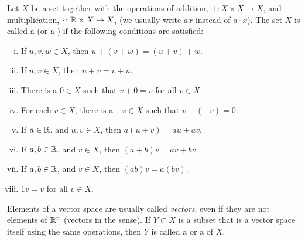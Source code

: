 \begin{defn}
Let $X$ be a set together with
the operations of addition, $+ \colon X \times X \to X$,
and multiplication, $\cdot \colon {\mathbb{R}} \times X \to X$,
(we usually write $ax$ instead of $a \cdot x$).
The set $X$ is called a \emph{}
(or a \emph{})
if the following conditions are satisfied:
\begin{enumerate}[(i)]
\item
If $u, v, w \in X$, then $u+(v+w) = (u+v)+w$.
\item
If $u, v \in X$, then $u+v = v+u$.
\item \label{vecspacedefn:addidentity}
There is a $0 \in X$ such that $v+0=v$ for all $v \in X$.
\item \label{vecspacedefn:addinverse}
For each $v \in X$, there is a $-v \in X$
such that $v+(-v)=0$.
\item
If $a \in {\mathbb{R}}$, and $u,v \in X$, then
$a(u+v) = au+av$.
\item
If $a,b \in {\mathbb{R}}$, and $v \in X$, then
$(a+b)v = av+bv$.
\item
If $a,b \in {\mathbb{R}}$, and $v \in X$, then
$(ab)v = a(bv)$.
\item
$1v = v$ for all $v \in X$.
\end{enumerate}
Elements of a vector space are usually called \emph{vectors},
even if they
are not elements of ${\mathbb{R}}^n$ (vectors in the  sense).
%
If $Y \subset X$ is a subset that is a vector space itself using the same
operations, then $Y$ is called a \emph{} or
a \emph{} of $X$.
\end{defn}

